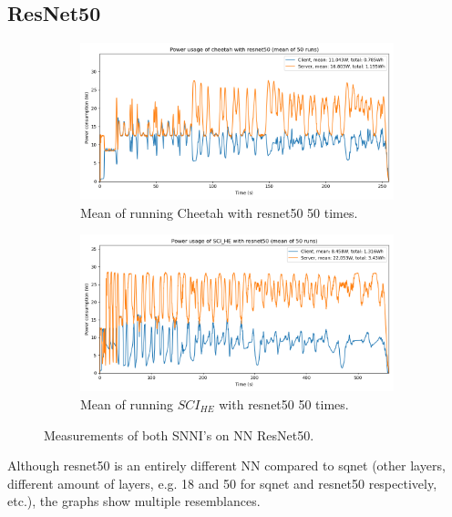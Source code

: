 \documentclass[../thesis.tex]{subfiles}
\begin{document}
\subsection{ResNet50}\label{subsection:resnet}
\begin{figure}[th!]
    \begin{subfigure}{.8\linewidth}
            \includegraphics[width=\textwidth]{Thesis/Images/Means/mean_cheetah-resnet50.png}
            \caption{Mean of running Cheetah with resnet50 50 times.}
            \label{fig:mean_cheetah_resnet50}
    \end{subfigure}
    \medskip
    \begin{subfigure}{.8\linewidth}
            \includegraphics[width=\textwidth]{Thesis/Images/Means/mean_SCI_HE-resnet50.png}
            \caption{Mean of running $SCI_{HE}$ with resnet50 50 times.}
            \label{fig:mean_SCI_HE_resnet50}
    \end{subfigure}

    \caption{Measurements of both SNNI's on NN ResNet50.}
\end{figure}
Although resnet50 is an entirely different NN compared to sqnet (other layers, different amount of layers, e.g. 18 and 50 for sqnet and resnet50 respectively, etc.), the graphs show multiple resemblances. 
\end{document}

